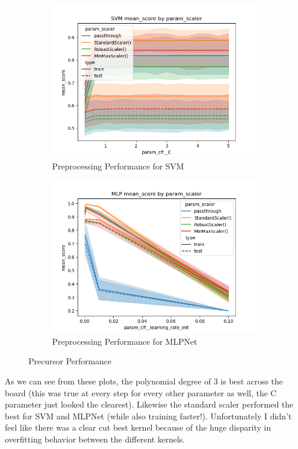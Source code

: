 \documentclass[12pt]{article}
\begin{document}
\begin{figure}
\begin{subfigure}{.5\textwidth}
        \includegraphics[width=.95\textwidth]{../results_second/svm/param_scaler_mean_score_param_clf__C.png}
        \caption{Preprocessing Performance for SVM} 
        \end{subfigure}%
      \begin{subfigure}{.5\textwidth}
        \includegraphics[width=.95\textwidth]{../results_second/mlp/param_scaler_mean_score_param_clf__learning_rate_init.png}
        \caption{Preprocessing Performance for MLPNet}
      \end{subfigure}
    \caption{Precursor Performance}
    \label{figure1}
\end{figure}

As we can see from these plots, the polynomial degree of 3 is best across the board (this was true at every step for every 
other parameter as well, the C parameter just looked the clearest). Likewise the standard scaler performed the best for SVM
and MLPNet (while also training faster!). Unfortunately I didn't feel like there was a clear cut best kernel because of 
the huge disparity in overfitting behavior between the different kernels. 
\end{document}
